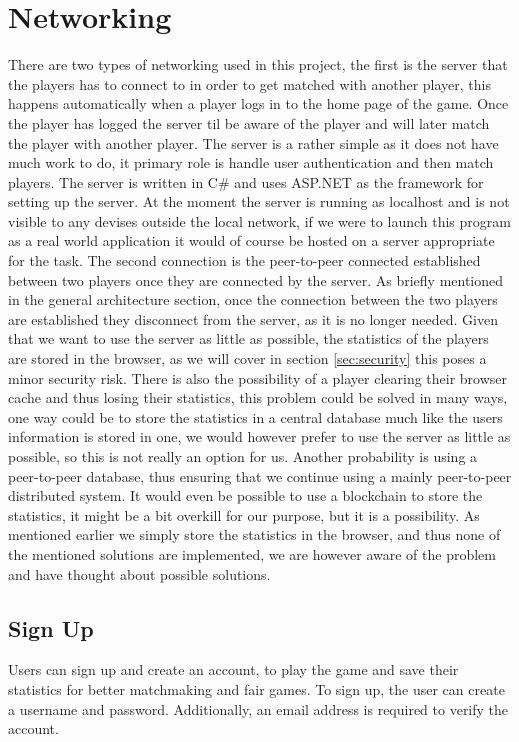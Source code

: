 \documentclass[ twoside,openright,titlepage,numbers=noenddot,headinclude,%
                footinclude=true,cleardoublepage=empty,abstractoff, %
                BCOR=5mm,paper=a4,fontsize=11pt,%
                ngerman,american,%
                ]{scrreprt}
\begin{document}
\section{Networking}
There are two types of networking used in this project, the first is the server that the players has to connect to in order to get matched with another player, this happens automatically when a player logs in to the home page of the game. Once the player has logged the server til be aware of the player and will later match the player with another player. The server is a rather simple as it does not have much work to do, it primary role is handle user authentication and then match players. The server is written in C\# and uses ASP.NET as the framework for setting up the server. At the moment the server is running as localhost and is not visible to any devises outside the local network, if we were to launch this program as a real world application it would of course be hosted on a server appropriate for the task. The second connection is the peer-to-peer connected established between two players once they are connected by the server. As briefly mentioned in the general architecture section, once the connection between the two players are established they disconnect from the server, as it is no longer needed. 
Given that we want to use the server as little as possible, the statistics of the players are stored in the browser, as we will cover in section \ref{sec:security} this poses a minor security risk. There is also the possibility of a player clearing their browser cache and thus losing their statistics, this problem could be solved in many ways, one way could be to store the statistics in a central database much like the users information is stored in one, we would however prefer to use the server as little as possible, so this is not really an option for us. Another probability is using a peer-to-peer database, thus ensuring that we continue using a mainly peer-to-peer distributed system. It would even be possible to use a blockchain to store the statistics, it might be a bit overkill for our purpose, but it is a possibility. As mentioned earlier we simply store the statistics in the browser, and thus none of the mentioned solutions are implemented, we are however aware of the problem and have thought about possible solutions.

\subsection{Sign Up}
Users can sign up and create an account, to play the game and save their statistics for better matchmaking and fair games. 
To sign up, the user can create a username and password. Additionally, an email address is required to verify the account.
\end{document}
